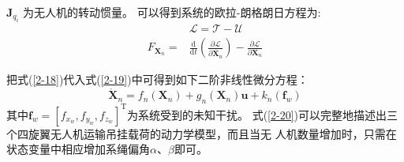 \documentclass[lang=chs, degree=master, blindreview=true, winfonts=true]{yanputhesis}
\begin{document}
$\boldsymbol{J}_{q_{i}}$ 为无人机的转动惯量。
可以得到系统的欧拉-朗格朗日方程为:
\begin{equation}
\begin{aligned}
	&\mathcal{L}=\mathcal{T}-\mathcal{U} \\
	{F}_{\boldsymbol{X}_n}=&\frac{\mathrm{d}}{\mathrm{d}t}\left(\frac{\partial\mathcal{L}}{\partial\dot{\boldsymbol{X}_n}}\right)-\frac{\partial\mathcal{L}}{\partial\boldsymbol{X}_n}
\end{aligned}
\label{2-19}
\end{equation}


把式(\ref{2-18})代入式(\ref{2-19})中可得到如下二阶非线性微分方程：
\begin{equation}	
	\dot{\bm X}_n= f_n(\bm X_n)+ g_n(\bm X_n)\bm u+ k_{n}\left(\bm f_{w}\right)
	\label{2-20}
\end{equation}
其中$\bm f_w=\left[f_{x_w},f_{y_w},f_{z_w}\right]^\mathrm{T}$为系统受到的未知干扰。
式(\ref{2-20})可以完整地描述出三个四旋翼无人机运输吊挂载荷的动力学模型，而且当无
人机数量增加时，只需在状态变量中相应增加系绳偏角$\alpha$、$\beta$即可。
\end{document}
